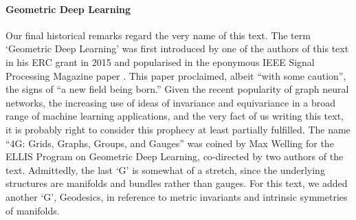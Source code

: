 \paragraph{Geometric Deep Learning}
Our final historical remarks regard the very name of this text.
%
The term `Geometric Deep Learning' was first introduced by one of the authors of this text in his ERC grant in 2015 and popularised in the eponymous IEEE Signal Processing Magazine paper \citep{bronstein2017geometric}. This paper proclaimed, albeit ``with some caution'', the signs of ``a new field being born.'' Given the recent popularity of graph neural networks, the increasing use of ideas of invariance and equivariance in a broad range of machine learning applications, and the very fact of us writing this text, it is probably right to consider this prophecy at least partially fulfilled. 
%
The name ``4G: Grids, Graphs, Groups, and Gauges'' was coined by Max Welling for the ELLIS Program on Geometric Deep Learning, co-directed by two authors of the text. Admittedly, the last `G' is somewhat of a stretch, since the underlying structures are manifolds and bundles rather than gauges. 
%
For this text, we added another `G', Geodesics, in reference to metric invariants and intrinsic symmetries of manifolds. 


